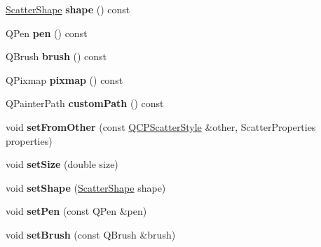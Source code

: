 \begin{DoxyCompactItemize}
\hyperlink{class_q_c_p_scatter_style_adb31525af6b680e6f1b7472e43859349}{Scatter\+Shape} {\bfseries shape} () const
\item 
\mbox{\label{class_q_c_p_scatter_style_acdd6313d16e69d3810e9d1f48dd9e4bb}} 
Q\+Pen {\bfseries pen} () const
\item 
\mbox{\label{class_q_c_p_scatter_style_adc4f66aed84f1d7a3a5aabf4f48f31a6}} 
Q\+Brush {\bfseries brush} () const
\item 
\mbox{\label{class_q_c_p_scatter_style_a9b2d1a2ec0aac0c74f7582d14050e93a}} 
Q\+Pixmap {\bfseries pixmap} () const
\item 
\mbox{\label{class_q_c_p_scatter_style_aef1fac84c9830fd97f2a8568e605e372}} 
Q\+Painter\+Path {\bfseries custom\+Path} () const
\item 
\mbox{\label{class_q_c_p_scatter_style_a7d59ba8864914f765817841089e436f1}} 
void {\bfseries set\+From\+Other} (const \hyperlink{class_q_c_p_scatter_style}{Q\+C\+P\+Scatter\+Style} \&other, Scatter\+Properties properties)
\item 
\mbox{\label{class_q_c_p_scatter_style_aaefdd031052892c4136129db68596e0f}} 
void {\bfseries set\+Size} (double size)
\item 
\mbox{\label{class_q_c_p_scatter_style_a7c641c4d4c6d29cb705d3887cfce91c1}} 
void {\bfseries set\+Shape} (\hyperlink{class_q_c_p_scatter_style_adb31525af6b680e6f1b7472e43859349}{Scatter\+Shape} shape)
\item 
\mbox{\label{class_q_c_p_scatter_style_a761f1f229cc0ca4703e1e2b89f6dd1ba}} 
void {\bfseries set\+Pen} (const Q\+Pen \&pen)
\item 
\mbox{\label{class_q_c_p_scatter_style_a74d692aaeb8d4b36d6f7d510e44264b1}} 
void {\bfseries set\+Brush} (const Q\+Brush \&brush)
\item 
\mbox{\label{class_q_c_p_scatter_style_a5fb611d46acfac520d7b89a1c71d9246}} 

\end{DoxyCompactItemize}
